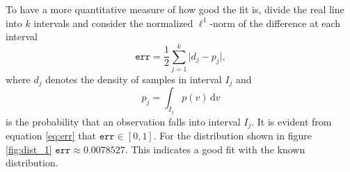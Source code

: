 To have a more quantitative measure of how good the fit is, divide the real line into $k$ intervals and consider the normalized $\ell^1$-norm of the difference at each interval 
\begin{equation}\label{eq:err}
	\texttt{err} = \frac{1}{2} \sum_{j=1}^{k} \rvert d_j - p_j\lvert,
\end{equation}
where $d_j$ denotes the density of samples in interval $I_j$ and 
\[
	p_j = \int_{I_j} p(v) \, \text{d}v
\]
is the probability that an observation falls into interval $I_j$. It is evident from equation \ref{eq:err} that $\texttt{err}\in [0,1]$. For the distribution shown in figure \ref{fig:dist_1} $\texttt{err} \approx  0.0078527$. This indicates a good fit with the known distribution.

%
%
%
%
%
